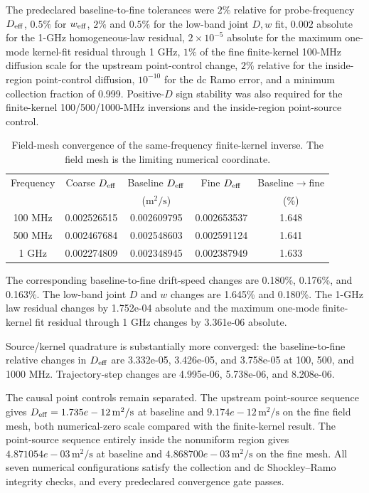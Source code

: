 \documentclass[aps,pra,onecolumn,superscriptaddress,nofootinbib]{revtex4-2}
\begin{document}
The predeclared baseline-to-fine tolerances were $2\%$ relative for probe-frequency $D_{\rm eff}$, $0.5\%$ for $w_{\rm eff}$, $2\%$ and $0.5\%$ for the low-band joint $D,w$ fit, $0.002$ absolute for the 1-GHz homogeneous-law residual, $2\times10^{-5}$ absolute for the maximum one-mode kernel-fit residual through 1 GHz, $1\%$ of the fine finite-kernel 100-MHz diffusion scale for the upstream point-control change, $2\%$ relative for the inside-region point-control diffusion, $10^{-10}$ for the dc Ramo error, and a minimum collection fraction of 0.999.  Positive-$D$ sign stability was also required for the finite-kernel 100/500/1000-MHz inversions and the inside-region point-source control.

\begin{table}[h]
\caption{Field-mesh convergence of the same-frequency finite-kernel inverse.  The field mesh is the limiting numerical coordinate.}
\centering
\begin{tabular}{ccccc}
\toprule
Frequency & Coarse $D_{\rm eff}$ & Baseline $D_{\rm eff}$ & Fine $D_{\rm eff}$ & Baseline$\to$fine\\
 & \multicolumn{3}{c}{($\mathrm{m^2/s}$)} & (\%)\\
\midrule
100 MHz & 0.002526515 & 0.002609795 & 0.002653537 & 1.648\\
500 MHz & 0.002467684 & 0.002548603 & 0.002591124 & 1.641\\
1 GHz   & 0.002274809 & 0.002348945 & 0.002387949 & 1.633\\
\bottomrule
\end{tabular}
\end{table}

The corresponding baseline-to-fine drift-speed changes are 0.180\%, 0.176\%, and 0.163\%.  The low-band joint $D$ and $w$ changes are 1.645\% and 0.180\%.  The 1-GHz law residual changes by 1.752e-04 absolute and the maximum one-mode finite-kernel fit residual through 1 GHz changes by 3.361e-06 absolute.

Source/kernel quadrature is substantially more converged: the baseline-to-fine relative changes in $D_{\rm eff}$ are 3.332e-05, 3.426e-05, and 3.758e-05 at 100, 500, and 1000 MHz.  Trajectory-step changes are 4.995e-06, 5.738e-06, and 8.208e-06.

The causal point controls remain separated.  The upstream point-source sequence gives $D_{\rm eff}=1.735e-12\,\mathrm{m^2/s}$ at baseline and $9.174e-12\,\mathrm{m^2/s}$ on the fine field mesh, both numerical-zero scale compared with the finite-kernel result.  The point-source sequence entirely inside the nonuniform region gives $4.871054e-03\,\mathrm{m^2/s}$ at baseline and $4.868700e-03\,\mathrm{m^2/s}$ on the fine mesh.  All seven numerical configurations satisfy the collection and dc Shockley--Ramo integrity checks, and every predeclared convergence gate passes.
\end{document}
